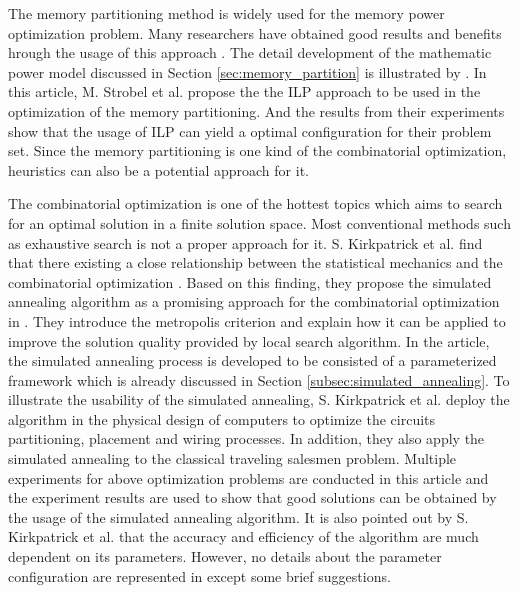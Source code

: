 \label{chap:related_work}
The memory partitioning method is widely used for the memory power
optimization problem. Many researchers have obtained good results
and benefits hrough the usage of this approach
\cite{Strobel2016, 876761, 4415607}.
The detail development of the mathematic power model discussed in
Section \ref{sec:memory_partition} is illustrated by \cite{Strobel2016}.
In this article, M. Strobel et al. propose the the ILP approach to
be used in the optimization of the memory partitioning. And the results
from their experiments show that the usage of ILP can yield a optimal
configuration for their problem set. Since the memory partitioning is
one kind of the combinatorial optimization, heuristics can also be a
potential approach for it.

The combinatorial optimization is one of the hottest topics which
aims to search for an optimal solution in a finite solution space.
Most conventional methods such as exhaustive search is not a proper
approach for it.
S. Kirkpatrick et al. find that there existing a close relationship
between the statistical mechanics and the combinatorial optimization
\cite{10.2307/1690046}.
Based on this finding, they propose the simulated annealing algorithm
as a promising approach for the combinatorial optimization in
\cite{10.2307/1690046}.
They introduce the metropolis criterion and explain how it can be
applied to improve the solution quality provided by local search
algorithm. In the article, the simulated annealing process is
developed to be consisted of a parameterized framework which is already
discussed in Section \ref{subsec:simulated_annealing}. To illustrate
the usability of the simulated annealing, S. Kirkpatrick et al. deploy
the algorithm in the physical design of computers to optimize the
circuits partitioning, placement and wiring processes.
In addition, they also apply the simulated annealing to the classical
traveling salesmen problem. Multiple experiments for above optimization
problems are conducted in this article and the experiment results are
used to show that good solutions can be obtained by the usage of the
simulated annealing algorithm. It is also pointed out by S. Kirkpatrick et al.
that the accuracy and efficiency of the algorithm are much dependent on
its parameters.
However, no details about the parameter configuration are
represented in \cite{10.2307/1690046} except some brief suggestions.

